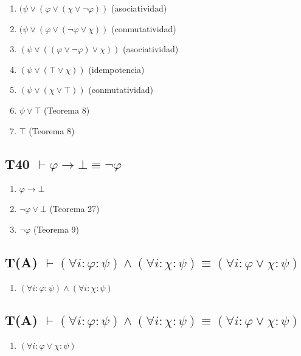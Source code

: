 \documentclass[a4paper,11pt]{article}
\begin{document}
\begin{enumerate}
    \item $(\psi \lor (\varphi \lor (\chi \lor \neg\varphi)) $ \hfill (asociatividad)
    \item $(\psi \lor (\varphi \lor (\neg\varphi \lor \chi)) $ \hfill (conmutatividad)
    \item $(\psi \lor ((\varphi \lor \neg\varphi) \lor \chi)) $ \hfill (asociatividad)
    \item $(\psi \lor (\top \lor \chi)) $ \hfill (idempotencia)
    \item $(\psi \lor (\chi \lor \top)) $ \hfill (conmutatividad)
    \item $\psi \lor \top $ \hfill (Teorema 8)
    \item $\top$ \hfill (Teorema 8)

\end{enumerate}

\subsection{T40 $\vdash \varphi \rightarrow \bot \equiv \neg\varphi$}

\begin{enumerate}
    \item $\varphi \rightarrow \bot$
    \item $\neg\varphi \lor \bot$ \hfill (Teorema 27)
    \item $\neg\varphi$ \hfill (Teorema 9)
\end{enumerate}

\subsection{T(A) $\vdash (\forall i : \varphi : \psi) \land (\forall i : \chi : \psi) \equiv (\forall i : \varphi \lor \chi : \psi)$}

\begin{enumerate}
    \item $(\forall i : \varphi : \psi) \land (\forall i : \chi : \psi)$
\end{enumerate}


\subsection{T(A) $\vdash (\forall i : \varphi : \psi) \land (\forall i : \chi : \psi) \equiv (\forall i : \varphi \lor \chi : \psi)$}

\begin{enumerate}
    \item $(\forall i : \varphi \lor \chi : \psi)$

\end{enumerate}
\end{document}
